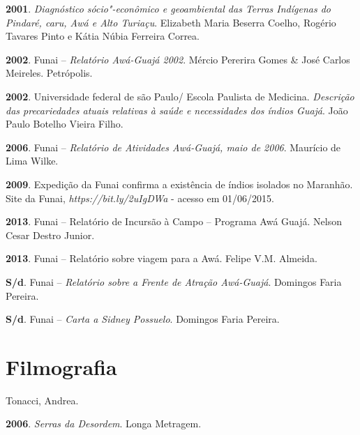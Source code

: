 \begin{Parskip}
\textbf{2001}. \emph{Diagnóstico sócio"-econômico e geoambiental das
Terras Indígenas do Pindaré, caru, Awá e Alto Turiaçu}. Elizabeth Maria
Beserra Coelho, Rogério Tavares Pinto e Kátia Núbia Ferreira Correa.

\textbf{2002}. Funai -- \emph{Relatório Awá-Guajá 2002}. Mércio Pererira
Gomes \& José Carlos Meireles. Petrópolis.

\textbf{2002}. Universidade federal de são Paulo/ Escola Paulista de
Medicina. \emph{Descrição das precariedades atuais relativas à saúde e
necessidades dos índios Guajá}. João Paulo Botelho Vieira Filho.

\textbf{2006}. Funai -- \emph{Relatório de Atividades Awá-Guajá, maio de
2006}. Maurício de Lima Wilke.

\textbf{2009}. Expedição da Funai confirma a existência de índios
isolados no Maranhão. Site da Funai,
\emph{https://bit.ly/2uIgDWa} - acesso em 01/06/2015.

\textbf{2013}. Funai -- Relatório de Incursão à Campo -- Programa Awá
Guajá. Nelson Cesar Destro Junior.

\textbf{2013}. Funai -- Relatório sobre viagem para a  Awá. Felipe V.M.
Almeida.

\textbf{S/d}. Funai -- \emph{Relatório sobre a Frente de Atração
Awá-Guajá}. Domingos Faria Pereira.

\textbf{S/d}. Funai -- \emph{Carta a Sidney Possuelo}. Domingos Faria
Pereira.

\section{Filmografia}

Tonacci, Andrea.

\textbf{2006}. \emph{Serras da Desordem}. Longa Metragem.
\end{Parskip}

